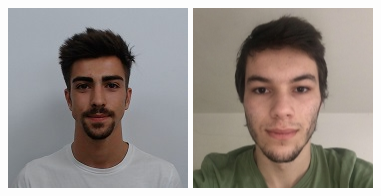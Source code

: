 \documentclass[11pt]{article}
\begin{document}
\begin{titlepage}
\begin{center}
\begin{figure}[hbt!]
                \centering
                \captionsetup{PG47577}
            \endminipage
            \hfill
                \includegraphics[width=\linewidth]{images/capa/137.jpeg} 
                \centering
                \captionsetup{PG47068}
            \endminipage
            \hfill
                \includegraphics[width=\linewidth]{images/capa/152.png} 
                \centering
                \captionsetup{PG47187}
            \endminipage
        \end{figure}


\end{center}
\end{titlepage}
\end{document}
